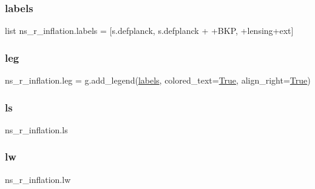 \mbox{\label{namespacens__r__inflation_a520c51d166173229d57c7a2b319a28e1}} 
\subsubsection{\texorpdfstring{labels}{labels}}
{\footnotesize\ttfamily list ns\+\_\+r\+\_\+inflation.\+labels = \mbox{[}s.\+defplanck, s.\+defplanck + \textquotesingle{}+B\+KP\textquotesingle{}, \textquotesingle{}+lensing+ext\textquotesingle{}\mbox{]}}

\mbox{\label{namespacens__r__inflation_acbcd29f7b821fa46159bd0d812da2b77}} 
\subsubsection{\texorpdfstring{leg}{leg}}
{\footnotesize\ttfamily ns\+\_\+r\+\_\+inflation.\+leg = g.\+add\+\_\+legend(\mbox{\hyperlink{namespacens__r__inflation_a520c51d166173229d57c7a2b319a28e1}{labels}}, colored\+\_\+text=\mbox{\hyperlink{namespacens__r__inflation_afa3e6b64342d2f01d5b24a044663ad0b}{True}}, align\+\_\+right=\mbox{\hyperlink{namespacens__r__inflation_afa3e6b64342d2f01d5b24a044663ad0b}{True}})}

\mbox{\label{namespacens__r__inflation_a6f05ee014ddc37fdcf41fe30d89008b2}} 
\subsubsection{\texorpdfstring{ls}{ls}}
{\footnotesize\ttfamily ns\+\_\+r\+\_\+inflation.\+ls}

\mbox{\label{namespacens__r__inflation_a3279562fc089b9cf6b89074136bdbc98}} 
\subsubsection{\texorpdfstring{lw}{lw}}
{\footnotesize\ttfamily ns\+\_\+r\+\_\+inflation.\+lw}

